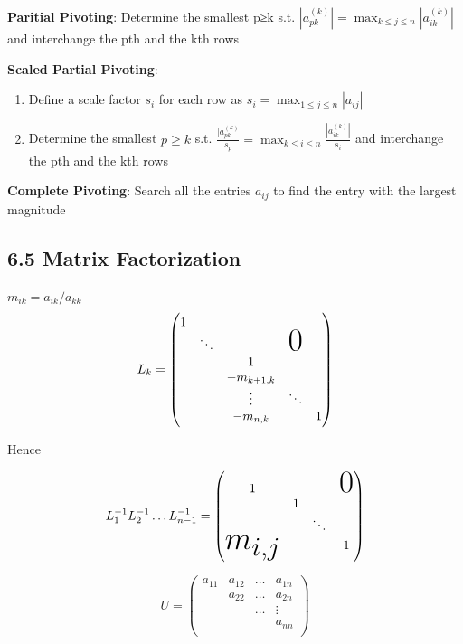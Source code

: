 \documentclass[11pt]{article}
\begin{document}
\textbf{Paritial Pivoting}: Determine the smallest p≥k s.t.
\(|a_{pk}^{(k)}|=\displaystyle\max_{k\le j\le n}|a_{ik}^{(k)}|\) and
interchange the pth and the kth rows

\textbf{Scaled Partial Pivoting}:
\begin{enumerate}
\item Define a scale factor \(s_i\) for each row as \(s_i=\displaystyle\max_{1\le
      j\le n}|a_{ij}|\)
\item Determine the smallest \(p\ge k\) s.t.
\(\frac{|a_{pk}^{(k)}}{s_p}=\displaystyle\max_{k\le i\le
      n}\frac{|a_{ik}^{(k)}|}{s_i}\)
and interchange the pth and the kth rows
\end{enumerate}


\textbf{Complete Pivoting}: Search all the entries \(a_{ij}\) to find the entry with
the largest magnitude
\subsection{6.5 Matrix Factorization}
\label{sec:orgc22bccb}
\(m_{ik}=a_{ik}/a_{kk}\)
\begin{equation*}
L_k=
\begin{pmatrix}
1 &            &            &               &  \\
  & \ddots     &            &\mbox{\Huge 0} &  \\
  &            & 1          &               &  \\
  &            & -m_{k+1,k} &               &  \\
  &            & \vdots     & \ddots        &  \\
  &            & -m_{n,k}   &               & 1\\
\end{pmatrix}
\end{equation*}  


Hence 

\begin{equation*}
L_1^{-1}L_2^{-1}\dots L_{n-1}^{-1}=
\begin{pmatrix}
1&&&\mbox{\Huge 0}\\
&1&&\\
&&\ddots&\\
\text{\Huge $m_{i,j}$}&&&1\\
\end{pmatrix}
\end{equation*}

\begin{equation*}
U=
\begin{pmatrix}
a_{11}&a_{12}&\dots&a_{1n}\\
&a_{22}&\dots&a_{2n}\\
&&\dots&\vdots\\
&&&a_{nn}\\
\end{pmatrix}
\end{equation*}
\end{document}
